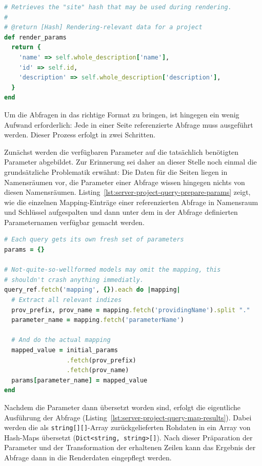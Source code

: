 \begin{lstlisting}[float=h, language=Ruby, caption={Bereitstellung der Renderdaten in der Projektklasse}, label={lst:server-project-render-data}]
# Retrieves the "site" hash that may be used during rendering.
#
# @return [Hash] Rendering-relevant data for a project
def render_params
  return {
    'name' => self.whole_description['name'],
    'id' => self.id,
    'description' => self.whole_description['description'],
  }
end
\end{lstlisting}

Um die Abfragen in das richtige Format zu bringen, ist hingegen ein wenig Aufwand erforderlich: Jede in einer Seite referenzierte Abfrage muss ausgeführt werden. Dieser Prozess erfolgt in zwei Schritten.

Zunächst werden die verfügbaren Parameter auf die tatsächlich benötigten Parameter abgebildet. Zur Erinnerung sei daher an dieser Stelle noch einmal die grundsätzliche Problematik erwähnt: Die Daten für die Seiten liegen in Namensräumen vor, die Parameter einer Abfrage wissen hingegen nichts von diesen Namensräumen. Listing~\ref{lst:server-project-query-prepare-params} zeigt, wie die einzelnen Mapping-Einträge einer referenzierten Abfrage in Namensraum und Schlüssel aufgespalten und dann unter dem in der Abfrage definierten Parameternamen verfügbar gemacht werden.

\begin{lstlisting}[float=p, language=Ruby, caption={Renderdaten einer Abfrage (1): Parameter binden}, label={lst:server-project-query-prepare-params}]
# Each query gets its own fresh set of parameters
params = {}

# Not-quite-so-wellformed models may omit the mapping, this
# shouldn't crash anything immediatly.
query_ref.fetch('mapping', {}).each do |mapping|
  # Extract all relevant indizes
  prov_prefix, prov_name = mapping.fetch('providingName').split "."
  parameter_name = mapping.fetch('parameterName')
  
  # And do the actual mapping
  mapped_value = initial_params
                 .fetch(prov_prefix)
                 .fetch(prov_name)
  params[parameter_name] = mapped_value
end
\end{lstlisting}

Nachdem die Parameter dann übersetzt worden sind, erfolgt die eigentliche Ausführung der Abfrage (Listing~\ref{lst:server-project-query-map-results}). Dabei werden die als \texttt{string[][]}-Array zurückgelieferten Rohdaten in ein Array von Hash-Maps übersetzt (\texttt{Dict<string, string>[]}). Nach dieser Präparation der Parameter und der Transformation der erhaltenen Zeilen kann das Ergebnis der Abfrage dann in die Renderdaten eingepflegt werden.

